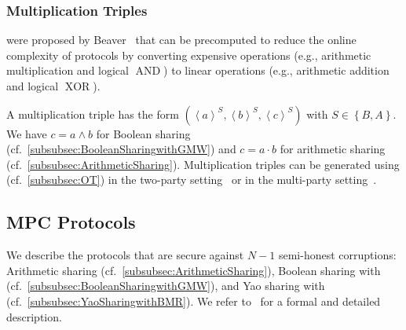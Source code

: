\subsubsection{Multiplication Triples}
\label{subsubsec:MTs}
\mts were proposed by Beaver~\cite{beaver1991efficient} that can be precomputed to reduce the online complexity of \smpc protocols by converting expensive operations (e.g., arithmetic multiplication and logical $\operatorname{AND}$) to linear operations (e.g., arithmetic addition and logical $\operatorname{XOR}$).

A multiplication triple has the form $\left(\left\langle a\right\rangle^S , \left\langle b\right\rangle^S,\left\langle c\right\rangle^S\right) $ with $S\in \left\{B,A\right\} $.
We have $c=a\land b$ for Boolean sharing (cf.~\autoref{subsubsec:BooleanSharingwithGMW}) and $c=a \cdot  b$ for arithmetic sharing (cf.~\autoref{subsubsec:ArithmeticSharing}).
Multiplication triples can be generated using \correlatedot (cf.~\autoref{subsubsec:OT}) in the two-party setting~\cite{demmler2015aby} or in the multi-party setting~\cite{braun2022motion}.



\subsection{MPC Protocols}
\label{subsec:MPCProtocols}
We describe the \smpc protocols that are secure against $N-1$ semi-honest corruptions: Arithmetic sharing (cf.~\autoref{subsubsec:ArithmeticSharing}), Boolean sharing with \gmw (cf.~\autoref{subsubsec:BooleanSharingwithGMW}), and Yao sharing with \bmr (cf.~\autoref{subsubsec:YaoSharingwithBMR}).
We refer to~\cite{demmler2015aby, braun2022motion} for a formal and detailed description.

